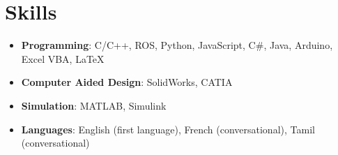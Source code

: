 \documentclass[letterpaper,11pt]{article}
\newcommand{\resumeSkillItemHeading}[2]{
  \item\small{
    \textbf{#1}{: #2 \vspace{-2pt}}
  }
}
\newcommand{\resumeSubHeadingListEnd}{\end{itemize}}
\newcommand{\resumeItemListStart}{\begin{itemize}}
\newcommand{\resumeItemListEnd}{\end{itemize}\vspace{-5pt}}
\begin{document}




\section{Skills}
\resumeItemListStart

\resumeSkillItemHeading
{Programming}
{C/C++, ROS, Python, JavaScript, C\#, Java, Arduino, Excel VBA, \LaTeX}

\resumeSkillItemHeading
{Computer Aided Design}
{SolidWorks, CATIA}

\resumeSkillItemHeading
{Simulation}
{MATLAB, Simulink}


\resumeSkillItemHeading
{Languages}
{English (first language), French (conversational), Tamil (conversational)}

\resumeItemListEnd

\end{document}
